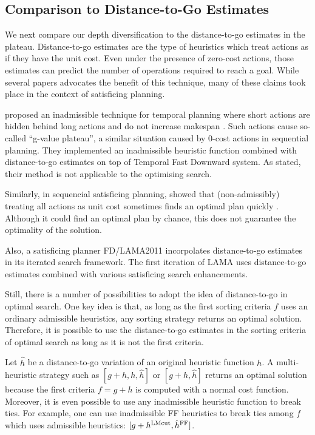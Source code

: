 \subsection{Comparison to Distance-to-Go Estimates}

We next compare our depth diversification to the distance-to-go
estimates in the plateau.  Distance-to-go estimates are the type of
heuristics which treat actions as if they have the unit cost. Even under
the presence of zero-cost actions, those estimates can predict the
number of operations required to reach a goal.
While several papers advocates the benefit of this technique, many of
these claims took place in the context of satisficing planning.

 proposed an inadmissible technique for temporal
planning where short actions are hidden behind long actions and do not
increase makespan \cite{benton2010g}. Such actions cause so-called
``g-value plateau'', a similar situation caused by 0-cost actions in
sequential planning.  They implemented an inadmissible heuristic
function combined with distance-to-go estimates on top of
Temporal Fast Downward system.  As stated, their method is not
applicable to the optimising search.
 
Similarly, in sequencial satisficing planning,
 showed that
(non-admissibly) treating all actions as unit cost sometimes finds an
optimal plan quickly \cite{cushing2010cost}.
Although it could find an optimal plan by chance, this does not
guarantee the optimality of the solution.
 
Also, a \sota satisficing planner FD/LAMA2011 incorpolates
distance-to-go estimates in its iterated search framework. The first
iteration of LAMA uses distance-to-go estimates combined with various
satisficing search enhancements.

Still, there is a number of possibilities to adopt the idea of distance-to-go in optimal search.
One key idea is that, as long as the first sorting criteria $f$ uses an ordinary
admissible heuristics, any sorting strategy returns an optimal solution.
Therefore, it is possible to use the
distance-to-go estimates in the sorting criteria of optimal search as
long as it is not the first criteria.
 
Let $\hat{h}$ be a distance-to-go variation of an original heuristic function $h$.
% 
A multi-heuristic strategy such as $[g+h,h,\hat{h}]$ or $[g+h,\hat{h}]$
returns an optimal solution because the first criteria $f=g+h$ is computed with
a normal cost function.
Moreover, it is even possible to use any inadmissible heuristic function to break
ties. For example, one can use inadmissible FF heuristics to break ties
among $f$ which uses admissible \lmcut heuristics: $[g+h^{\text{LMcut}},\hat{h}^{\text{FF}}]$.


